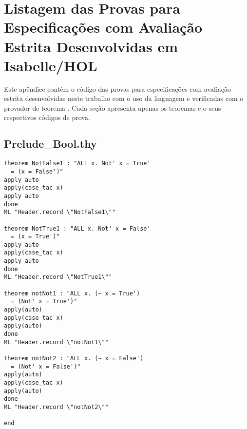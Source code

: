 \chapter{Listagem das Provas para Especificações com Avaliação Estrita Desenvolvidas em Isabelle/HOL}
\label{appendix:strictProofs}
Este apêndice contém o código das provas para especificações com avaliação estrita desenvolvidas neste trabalho com o uso da linguagem \HOL e verificadas com o provador de teorema \Isabelle.
Cada seção apresenta apenas os teoremas e o seus respectivos códigos de prova.

\section{Prelude\_Bool.thy}
\label{appendix:strictProofs:Bool}
\begin{multicols}{2}
\tiny
\begin{Verbatim}
theorem NotFalse1 : "ALL x. Not' x = True' 
  = (x = False')"
apply auto
apply(case_tac x)
apply auto
done
ML "Header.record \"NotFalse1\""

theorem NotTrue1 : "ALL x. Not' x = False' 
  = (x = True')"
apply auto
apply(case_tac x)
apply auto
done
ML "Header.record \"NotTrue1\""

theorem notNot1 : "ALL x. (~ x = True') 
  = (Not' x = True')"
apply(auto)
apply(case_tac x)
apply(auto)
done
ML "Header.record \"notNot1\""

theorem notNot2 : "ALL x. (~ x = False') 
  = (Not' x = False')"
apply(auto)
apply(case_tac x)
apply(auto)
done
ML "Header.record \"notNot2\""

end
\end{Verbatim}
\end{multicols}

